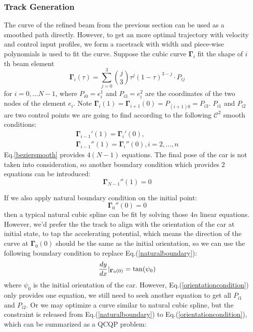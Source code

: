 \documentclass[conference, onecolumn]{IEEEtran}
\begin{document}
\subsubsection{Track Generation}\label{trackgeneration}
The curve of the refined beam from the previous section can be used as a smoothed path directly. However, to get an more optimal trajectory with velocity and control input profiles, we form a racetrack with width and piece-wise polynomials is used to fit the curve. Suppose the cubic curve $\mathbf{\Gamma}_i$ fit the shape of $i$th beam element\cite{prautzsch2002bezier}
\begin{equation}\label{cubic}
	\mathbf{\Gamma}_i(\tau)=\sum_{j = 0}^{3}\binom{j}{3}  \tau^j(1-\tau)^{3-j}\cdot P_{ij}
\end{equation}
for $i=0,...N-1$, where $P_{i0}=e^1_{i}$ and $P_{i3}=e^2_i$ are the coordinates of the two nodes of the element $e_i$. Note  $\mathbf{\Gamma}_{i}(1) =\mathbf{\Gamma}_{i+1}(0) = P_{(i+1)0}=P_{i3} $. $P_{i1}$ and $P_{i2}$ are two control points we are going to find according to the following $\mathcal{C} ^2$ smooth conditions:
\begin{equation}\label{beziersmooth}
	\begin{array}{l}
		\mathbf{\Gamma}_{i-1}'(1)=\mathbf{\Gamma}_{i}'(0), \\
		\mathbf{\Gamma}_{i-1}''(1)=\mathbf{\Gamma}_{i}''(0), i=2,...,n
	\end{array}	
\end{equation}
Eq.\ref{beziersmooth} provides $4(N-1)$ equations.
The final pose of the car is not taken into consideration, so another boundary condition which provides $2$ equations can be introduced:
\begin{equation}\label{naturalboundaryend}
	\mathbf{\Gamma}_{N-1}''(1)=0
\end{equation}


If we also apply natural boundary condition on the initial point:
\begin{equation}\label{naturalboundary}
	\mathbf{\Gamma}_{0}''(0)=0
\end{equation}
then a typical natural cubic spline can be fit by solving those $4n$ linear equations. However, we'd prefer the the track to align with the orientation of the car at initial state, to tap the accelerating potential, which means the direction of the curve at $\mathbf{\Gamma}_{0}(0)$ should be the same as the initial orientation, so we can use the following boundary condition to replace Eq.(\ref{naturalboundary}):
\begin{equation}\label{orientationcondition}
	\frac{dy}{dx} | _{\mathbf{\Gamma}_{0}(0)}=\tan(\psi_0)\\
\end{equation}
where $\psi_0$ is the initial orientation of the car.
However, Eq.(\ref{orientationcondition}) only provides one equation, we still need to seek another equation to get all $P_{i1}$ and $P_{i2}$. Or we may optimize a curve similar to natural cubic spline, but the constraint is released from Eq.(\ref{naturalboundary}) to Eq.(\ref{orientationcondition}), which can be summarized as a QCQP problem:
\end{document}
